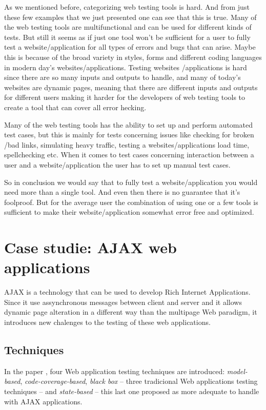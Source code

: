 \documentclass[a4paper]{article}
\begin{document}
 
As we mentioned before, categorizing web testing tools is hard. And from just these few examples that we just presented 
one can see that this is true. Many of the web testing tools are multifunctional and can be used for different kinds of 
tests. But still it seems as if just one tool won’t be sufficient for a user to fully test a website/application for all 
types of errors and bugs that can arise. Maybe this is because of the broad variety in styles, forms and different coding 
languages in modern day’s websites/applications.  Testing websites /applications is hard since there are so many inputs 
and outputs to handle, and many of today’s websites are dynamic pages, meaning that there are different inputs and outputs 
for different users making it harder for the developers of web testing tools to create a tool that can cover all error hecking.
  
Many of the web testing tools has the ability to set up and perform automated test cases, but this is mainly for tests 
concerning issues like checking for broken /bad links, simulating heavy traffic, testing a websites/applications load 
time, spellchecking etc. When it comes to test cases concerning interaction between a user and a website/application 
the user has to set up manual test cases.   
 
So in conclusion we would say that to fully test a website/application you would need more than a single tool. And even then 
there is no guarantee that it’s foolproof.  But for the average user the combination of using one or a few tools is 
sufficient to make their website/application somewhat error free and optimized.



\section{Case studie: AJAX web applications \cite{mtr08}}

AJAX is a technology that can be used to develop Rich Internet Applications.
Since it use assynchronous messages between client and server and it allows dynamic page alteration in a different way than the multipage Web paradigm, it introduces new chalenges to the testing of these web applications.

\subsection{Techniques}
In the paper \cite{mtr08}, four Web application testing techniques are introduced: \emph{model-based}, \emph{code-coverage-based}, \emph{black box} -- three tradicional Web applications testing techniques -- and \emph{state-based} -- this last one proposed as more adequate to handle with AJAX applications.
\end{document}
